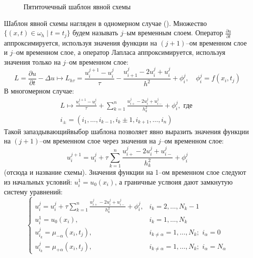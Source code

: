 \begin{figure}
    \centering
    \caption{Пятиточечный шаблон явной схемы}
    \label{fig:ExplicitTemplate}
\end{figure}
Шаблон явной схемы нагляден в одномерном случае ().
Множество $\{(x, t) \in \omega_h \mid t = t_j\}$ будем называть $j$--ым временным слоем.
Оператор $\frac{\partial u}{\partial t}$ аппроксимируется, используя значения функции на $(j + 1)$--ом временном слое и $j$--ом временном слое, а оператор Лапласа аппроксимируется, используя значения только на $j$--ом временном слое:
\begin{equation*}
    L = \frac{\partial u}{\partial t} - \Delta u \mapsto 
    L_{h\tau} = \frac{u_i^{j + 1} - u_i^j}{\tau} - 
    \frac{u_{i + 1}^j - 2u_i^j + u_i^j}{h^2} + \phi_i^j,\quad \phi_i^j = f(x_i, t_j)
\end{equation*}
В многомерном случае:
\begin{multline*}
    L \mapsto 
    \frac{u_i^{j + 1} - u_i^j}{\tau} + \sum\limits_{k = 1}^{n}
    \frac{u_{i+}^j - 2u_i^j + u_{i-}^j}{h_k^2} + \phi_i^j,\text{ где }\\
    i_{\pm} = (i_1, \ldots, i_{k - 1}, i_k \pm 1, i_{k + 1}, \ldots, i_n)
\end{multline*}
Такой \glqq запаздывающий\grqq выбор шаблона позволяет явно выразить значения функции на $(j + 1)$--ом временном слое через значения на $j$--ом временном слое:
\begin{equation}\label{eq:explicit_scheme}
    u_i^{j + 1} = u_i^j + \tau \sum\limits_{k = 1}^{n}
    \frac{u_{i+}^j - 2u_i^j + u_{i-}^j}{h_k^2} + \phi_i^j
\end{equation}
(отсюда и название схемы). Значения функции на 1--ом временном слое следуют из начальных условий: $u_i^1 = u_0(x_i)$, а граничные услвоия дают замкнутую систему уравнений:
\begin{equation*}
    \begin{cases}
        u_i^{j} = u_i^j + \tau \sum\limits_{k = 1}^{n} \frac{u_{i+}^j - 2u_i^j + u_{i-}^j}{h_k^2} + \phi_i^j, & i_k = 2, \ldots, N_k - 1\\
        u_i^1 = u_0(x_i), & i_k = 1, \ldots, N_k\\
        u_{i_k}^{j} = \mu_{-\alpha}(x_i, t_j), & i_{k \ne \alpha} = 1, \ldots, N_k;\,\, i_{\alpha} = 0\\
        u_{i_k}^{j} = \mu_{+\alpha}(x_i, t_j), & i_{k \ne \alpha} = 1, \ldots, N_k;\,\, i_{\alpha} = N_{\alpha}
    \end{cases}
\end{equation*}
